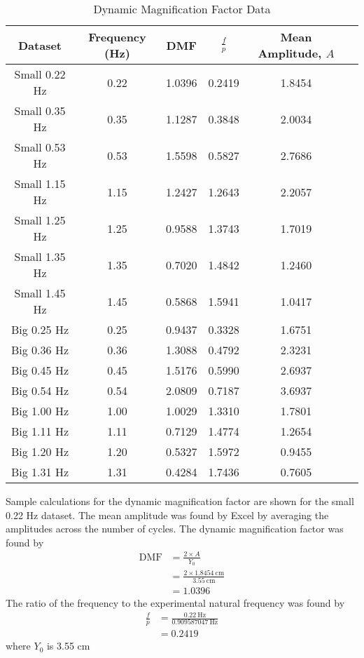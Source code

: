 \begin{table}[H]
    \centering
    \caption{Dynamic Magnification Factor Data}
    \label{tab:dmf_data}
    \begin{tabular}{cccccc}
    \toprule
        Dataset & Frequency (Hz) & DMF & $\frac{f}{p}$ & Mean Amplitude, $A$ \\
        \midrule
        Small 0.22 Hz & 0.22 & 1.0396 & 0.2419 & 1.8454 \\
        Small 0.35 Hz & 0.35 & 1.1287 & 0.3848 & 2.0034 \\
        Small 0.53 Hz & 0.53 & 1.5598 & 0.5827 & 2.7686 \\
        Small 1.15 Hz & 1.15 & 1.2427 & 1.2643 & 2.2057 \\
        Small 1.25 Hz & 1.25 & 0.9588 & 1.3743 & 1.7019 \\
        Small 1.35 Hz & 1.35 & 0.7020 & 1.4842 & 1.2460 \\
        Small 1.45 Hz & 1.45 & 0.5868 & 1.5941 & 1.0417 \\
        Big 0.25 Hz & 0.25 & 0.9437 & 0.3328 & 1.6751 \\
        Big 0.36 Hz & 0.36 & 1.3088 & 0.4792 & 2.3231 \\
        Big 0.45 Hz & 0.45 & 1.5176 & 0.5990 & 2.6937 \\
        Big 0.54 Hz & 0.54 & 2.0809 & 0.7187 & 3.6937 \\
        Big 1.00 Hz & 1.00 & 1.0029 & 1.3310 & 1.7801 \\
        Big 1.11 Hz & 1.11 & 0.7129 & 1.4774 & 1.2654 \\
        Big 1.20 Hz & 1.20 & 0.5327 & 1.5972 & 0.9455 \\
        Big 1.31 Hz & 1.31 & 0.4284 & 1.7436 & 0.7605 \\
        \bottomrule
    \end{tabular}
\end{table}

Sample calculations for the dynamic magnification factor are shown for the small 0.22 Hz dataset. The mean amplitude was found by Excel by averaging the amplitudes across the number of cycles. The dynamic magnification factor was found by
\begin{align*}
    \text{DMF} &= \frac{2 \times A}{Y_0} \\
    &= \frac{2 \times \qty{1.8454}{\centi\meter}}{\qty{3.55}{\centi\meter}} \\
    &= \boxed{1.0396}
\end{align*}
The ratio of the frequency to the experimental natural frequency was found by
\begin{align*}
    \frac{f}{p} &= \frac{\qty{0.22}{\hertz}}{\qty{0.909587047}{\hertz}} \\
    &= \boxed{0.2419}
\end{align*}
where $Y_0$ is 3.55 cm
